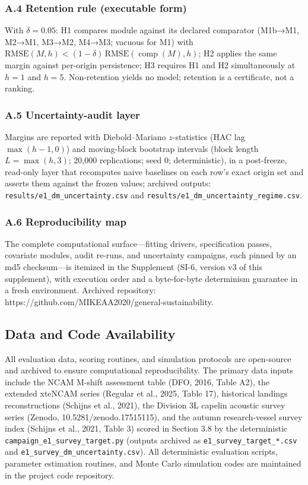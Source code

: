 \documentclass[11pt]{article}
\begin{document}
\subsubsection{A.4 Retention rule (executable
form)}\label{a.4-retention-rule-executable-form}

With \(\delta = 0.05\): H1 compares module against its declared
comparator (M1b→M1, M2→M1, M3→M2, M4→M3; vacuous for M1) with
\(\mathrm{RMSE}(M,h) < (1-\delta)\,\mathrm{RMSE}(\operatorname{comp}(M),h)\);
H2 applies the same margin against per-origin persistence; H3 requires
H1 and H2 simultaneously at \(h=1\) and \(h=5\). Non-retention yields no
model; retention is a certificate, not a ranking.

\subsubsection{A.5 Uncertainty-audit
layer}\label{a.5-uncertainty-audit-layer}

Margins are reported with Diebold--Mariano \(z\)-statistics (HAC lag
\(\max(h-1,0)\)) and moving-block bootstrap intervals (block length
\(L = \max(h,3)\); 20,000 replications; seed 0; deterministic), in a
post-freeze, read-only layer that recomputes naive baselines on each
row's exact origin set and asserts them against the frozen values;
archived outputs: \texttt{results/e1\_dm\_uncertainty.csv} and
\texttt{results/e1\_dm\_uncertainty\_regime.csv}.

\subsubsection{A.6 Reproducibility map}\label{a.6-reproducibility-map}

The complete computational surface---fitting drivers, specification
passes, covariate modules, audit re-runs, and uncertainty campaigns,
each pinned by an md5 checksum---is itemized in the Supplement (SI-6,
version v3 of this supplement), with execution order and a byte-for-byte
determinism guarantee in a fresh environment. Archived repository:
https://github.com/MIKEAA2020/general-sustainability.

\subsection{Data and Code
Availability}\label{data-and-code-availability}

All evaluation data, scoring routines, and simulation protocols are
open-source and archived to ensure computational reproducibility. The
primary data inputs include the NCAM M-shift assessment table (DFO,
2016, Table A2), the extended xteNCAM series (Regular et al., 2025,
Table 17), historical landings reconstructions (Schijns et al., 2021),
the Division 3L capelin acoustic survey series (Zenodo,
10.5281/zenodo.17515115), and the autumn research-vessel survey index
(Schijns et al., 2021, Table 3) scored in Section 3.8 by the
deterministic \texttt{campaign\_e1\_survey\_target.py} (outputs archived
as \texttt{e1\_survey\_target\_*.csv} and
\texttt{e1\_survey\_dm\_uncertainty.csv}). All deterministic evaluation
scripts, parameter estimation routines, and Monte Carlo simulation codes
are maintained in the project code repository.
\end{document}
